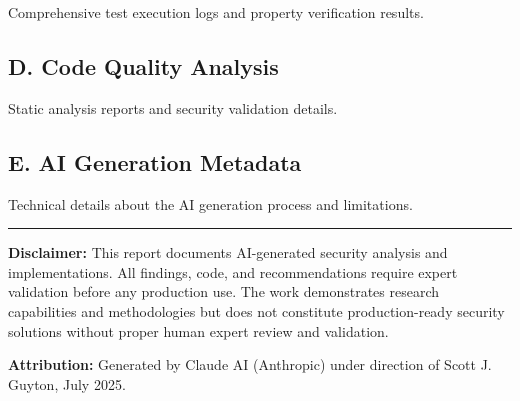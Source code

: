 \documentclass[11pt,a4paper]{article}
\begin{document}
Comprehensive test execution logs and property verification results.

\subsection{D. Code Quality Analysis}

Static analysis reports and security validation details.

\subsection{E. AI Generation Metadata}

Technical details about the AI generation process and limitations.

\vspace{2cm}

\hrule

\vspace{0.5cm}

\textbf{Disclaimer:} This report documents AI-generated security analysis and implementations. All findings, code, and recommendations require expert validation before any production use. The work demonstrates research capabilities and methodologies but does not constitute production-ready security solutions without proper human expert review and validation.

\textbf{Attribution:} Generated by Claude AI (Anthropic) under direction of Scott J. Guyton, July 2025.
\end{document}
